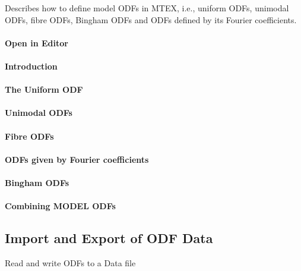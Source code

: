 \documentclass{article}
\begin{document}
		
                     \begin{par}
Describes how to define model ODFs in MTEX, i.e., uniform ODFs, unimodal ODFs, fibre ODFs, Bingham ODFs and ODFs defined by its Fourier coefficients.
\end{par} \vspace{1em}

                  
			\paragraph{Open in Editor}
		
			\paragraph{Introduction}
		
			\paragraph{The Uniform ODF}
		
			\paragraph{Unimodal ODFs}
		
			\paragraph{Fibre ODFs}
		
			\paragraph{ODFs given by Fourier coefficients}
		
			\paragraph{Bingham ODFs}
		
			\paragraph{Combining MODEL ODFs}
		
		\subsection{Import and Export of ODF Data}

		
                     \begin{par}
Read and write ODFs to a Data file
\end{par} \vspace{1em}
\end{document}
